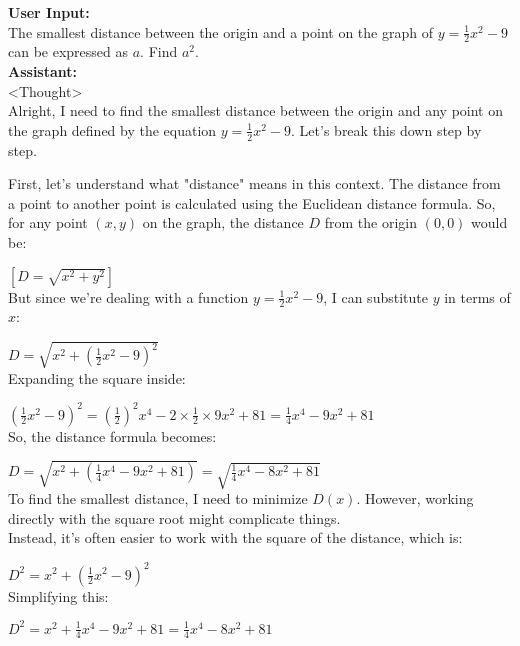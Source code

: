\begin{abox} 
\textbf{User Input:}  \\
The smallest distance between the origin and a point on the graph of $y=\frac{1}{2}x^2-9$ can be expressed as $a$.  Find $a^2$.  \\                           
 
\textbf{Assistant:}\\
<Thought>\\
Alright, I need to find the smallest distance between the origin and any point on the graph defined by the equation $ y = 
\frac{1}{2}x^2 - 9 $. Let's break this down step by step.\\
\end{abox}
\begin{abox}
First, let's understand what "distance" means in this context. The distance from a point to another point is calculated using the 
Euclidean distance formula. So, for any point $ (x, y) $ on the graph, the distance $ D $ from the origin $ (0, 0) $ would be:

$[
D = \sqrt{x^2 + y^2}
]
$\\

But since we're dealing with a function $ y = \frac{1}{2}x^2 - 9 $, I can substitute $ y $ in terms of $ x $:

$
D = \sqrt{x^2 + \left(\frac{1}{2}x^2 - 9\right)^2}
$\\

Expanding the square inside:

$
\left(\frac{1}{2}x^2 - 9\right)^2 = \left(\frac{1}{2}\right)^2 x^4 - 2 \times \frac{1}{2} \times 9x^2 + 81 = \frac{1}{4}x^4 - 9x^2 + 
81
$\\

So, the distance formula becomes:

$
D = \sqrt{x^2 + \left(\frac{1}{4}x^4 - 9x^2 + 81\right)} = \sqrt{\frac{1}{4}x^4 - 8x^2 + 81}
$\\

To find the smallest distance, I need to minimize $ D(x) $. However, working directly with the square root might complicate things. \\

Instead, it's often easier to work with the square of the distance, which is:

$
D^2 = x^2 + \left(\frac{1}{2}x^2 - 9\right)^2
$\\

Simplifying this:

$
D^2 = x^2 + \frac{1}{4}x^4 - 9x^2 + 81 = \frac{1}{4}x^4 - 8x^2 + 81
$\\


\end{abox}
